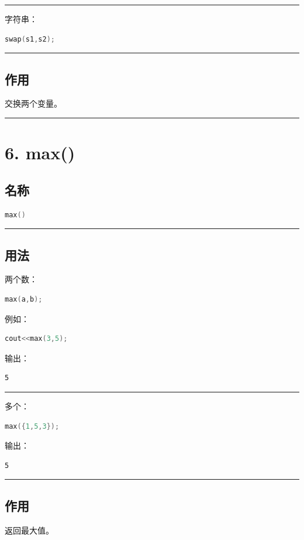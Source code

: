 \documentclass[9pt,twocolumn]{extarticle}
\begin{document}
\noindent\rule{\linewidth}{0.4pt}

字符串：
\begin{lstlisting}[language=C++]
swap(s1,s2);
\end{lstlisting}

\noindent\rule{\linewidth}{0.4pt}

\subsection{作用}
交换两个变量。

\noindent\rule{\linewidth}{0.4pt}

\section{6. max()}

\subsection{名称}
\begin{lstlisting}[language=C++]
max()
\end{lstlisting}

\noindent\rule{\linewidth}{0.4pt}

\subsection{用法}
两个数：
\begin{lstlisting}[language=C++]
max(a,b);
\end{lstlisting}
例如：
\begin{lstlisting}[language=C++]
cout<<max(3,5);
\end{lstlisting}
输出：
\begin{lstlisting}
5
\end{lstlisting}

\noindent\rule{\linewidth}{0.4pt}

多个：
\begin{lstlisting}[language=C++]
max({1,5,3});
\end{lstlisting}
输出：
\begin{lstlisting}
5
\end{lstlisting}

\noindent\rule{\linewidth}{0.4pt}

\subsection{作用}
返回最大值。
\end{document}

